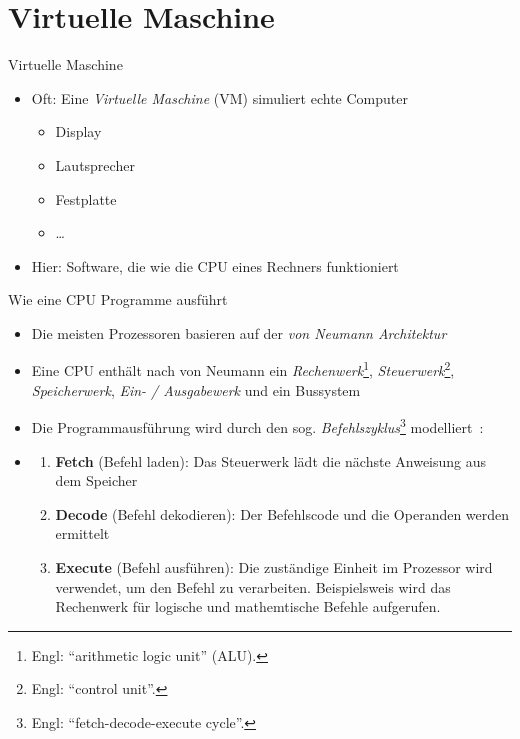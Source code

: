 \section{Virtuelle Maschine}

\begin{frame}{Virtuelle Maschine}
	\begin{itemize}
		\item Oft: Eine \emph{Virtuelle Maschine} (VM) simuliert echte Computer
		      \begin{itemize}
			      \item Display
			      \item Lautsprecher
			      \item Festplatte
			      \item \dots
		      \end{itemize}
		\item Hier: Software, die wie die CPU eines Rechners funktioniert
	\end{itemize}
\end{frame}

\begin{frame}{Wie eine CPU Programme ausführt }
	\begin{itemize}
		\item Die meisten Prozessoren basieren auf der \emph{von Neumann Architektur}~
		\item Eine CPU enthält nach von Neumann ein \emph{Rechenwerk}\footnote{Engl: \enquote{arithmetic logic unit} (ALU).}, \emph{Steuerwerk}\footnote{Engl: \enquote{control unit}.}, \emph{Speicherwerk}, \emph{Ein- / Ausgabewerk} und ein Bussystem~
		\item Die Programmausführung wird durch den sog. \emph{Befehlszyklus}\footnote{Engl: \enquote{fetch-decode-execute cycle}.} modelliert~:
		\item[] \begin{enumerate}
				\item \textbf{Fetch} (Befehl laden): Das Steuerwerk lädt die nächste Anweisung aus dem Speicher
				\item \textbf{Decode} (Befehl dekodieren): Der Befehlscode und die Operanden werden ermittelt
				\item \textbf{Execute} (Befehl ausführen): Die zuständige Einheit im Prozessor wird verwendet, um den Befehl zu verarbeiten.
				      Beispielsweis wird das Rechenwerk für logische und mathemtische Befehle aufgerufen.
			\end{enumerate}
	\end{itemize}
\end{frame}

